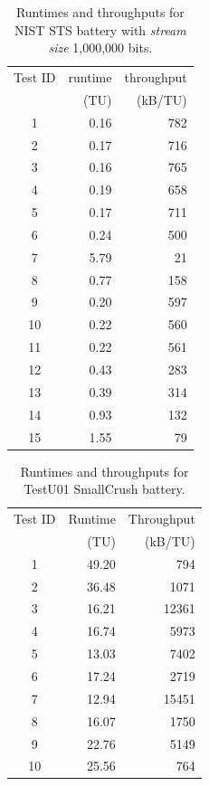 \documentclass[
  digital,     %
  oneside,     %
  nosansbold,  %
  nocolorbold, %
  nolof,         %
  nolot,         %
]{fithesis4}
\begin{document}
\begin{table}[H]
  \begin{tabularx}{0.5\textwidth}{c|r|r}
    Test ID & runtime & throughput\\
     & (TU) & (kB/TU) \\
    \midrule
    1 & 0.16 & 782 \\
    2 & 0.17 & 716 \\
    3 & 0.16 & 765 \\
    4 & 0.19 & 658 \\
    5 & 0.17 & 711 \\
    6 & 0.24 & 500 \\
    7 & 5.79 & 21 \\
    8 & 0.77 & 158 \\
    9 & 0.20 & 597 \\
    10 & 0.22 & 560 \\
    11 & 0.22 & 561 \\
    12 & 0.43 & 283 \\
    13 & 0.39 & 314 \\
    14 & 0.93 & 132 \\
15 & 1.55 & 79 \\
  \end{tabularx}
  \caption{Runtimes and throughputs for NIST STS battery with \emph{stream size} 1,000,000 bits.}
  \label{tab:analysis_nist_time}
\end{table}


\begin{table}[H]
  \begin{tabularx}{0.5\textwidth}{c|r|r}
    Test ID & Runtime & Throughput\\
     & (TU) & (kB/TU) \\
    \midrule
    1 & 49.20 & 794 \\
    2 & 36.48 & 1071 \\
    3 & 16.21 & 12361 \\
    4 & 16.74 & 5973 \\
    5 & 13.03 & 7402 \\
    6 & 17.24 & 2719 \\
    7 & 12.94 & 15451 \\
    8 & 16.07 & 1750 \\
    9 & 22.76 & 5149 \\
    10 & 25.56 & 764 \\
  \end{tabularx}
  \caption{Runtimes and throughputs for TestU01 SmallCrush battery.}
  \label{tab:analysis_smallcrush_time}
\end{table}
\end{document}
